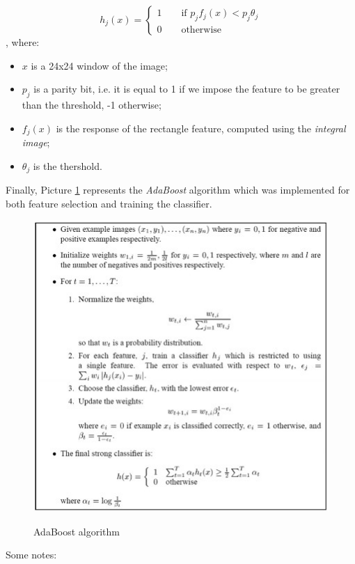 $$
h_j(x) = \begin{cases}
	1 \qquad \text{if } p_jf_j(x) < p_j\theta_j\\
	0 \qquad \text{otherwise}
	\end{cases}
$$
, where:

\begin{itemize}
    \item $x$ is a 24x24 window of the image;
    \item $p_j$ is a parity bit, i.e. it is equal to 1 if we impose the feature to be greater than the threshold, -1 otherwise;
    \item $f_j(x)$ is the response of the rectangle feature, computed using the \textit{integral image};
    \item $\theta_j$ is the thershold.
\end{itemize}

Finally, Picture \ref{adaboost} represents the \textit{AdaBoost} algorithm which was implemented for both feature selection and training the classifier.

\begin{figure}[h!]
		\centering
		\includegraphics[scale = 1.8]{img/adaboost.jpg}
        \label{adaboost}
        \caption{AdaBoost algorithm}
\end{figure}

Some notes:

